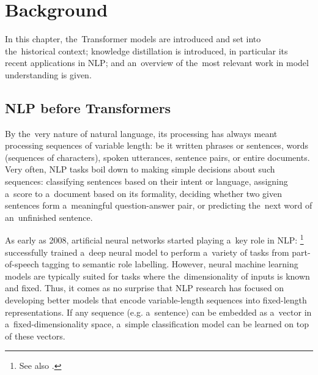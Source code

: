 \documentclass[bsc,frontabs,singlespacing,parskip,deptreport]{infthesis}
\begin{document}
\chapter{Background}{
  \label{ch:background}

  In this chapter, the~Transformer models are introduced and set into the~historical context; knowledge distillation is introduced, in particular its recent applications in NLP; and an~overview of the~most relevant work in model understanding is given.

  \section{NLP before Transformers}{
    \label{sec:pre-transformer-nlp}
    By the~very nature of natural language, its processing has always meant processing sequences of variable length: be it written phrases or sentences, words (sequences of characters), spoken utterances, sentence pairs, or entire documents.
    Very often, NLP tasks boil down to making simple decisions about such sequences: classifying sentences based on their intent or language, assigning a~score to a~document based on its formality, deciding whether two given sentences form a~meaningful question-answer pair, or predicting the~next word of an~unfinished sentence.

    As early as 2008, artificial neural networks started playing a~key role in NLP: \citet{Collobert_Weston_2008}\footnote{See also \citet{Collobert_Weston_2011}.} successfully trained a~deep neural model to perform a~variety of tasks from part-of-speech tagging to semantic role labelling.
    However, neural machine learning models are typically suited for tasks where the~dimensionality of inputs is known and fixed. Thus, it comes as no surprise that NLP research has focused on developing better models that encode variable-length sequences into fixed-length representations. 
    If any sequence (e.g. a~sentence) can be embedded as a~vector in a~fixed-dimensionality space, a~simple classification model can be learned on top of these vectors.
    
}}
\end{document}
